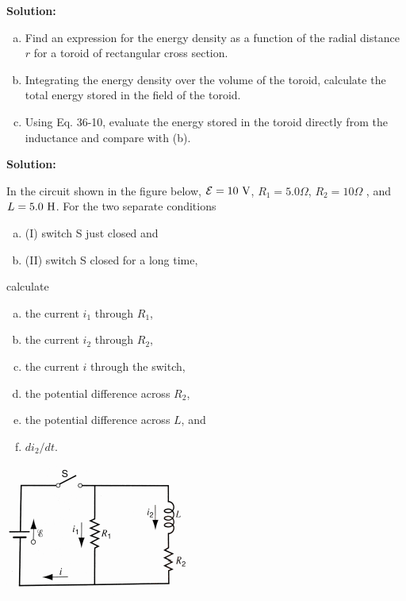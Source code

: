 \documentclass[11pt]{article}
\newcommand{\be}{\begin{enumerate}[a) ]}
\newcommand{\ee}{\end{enumerate}}
\begin{document}
\textbf{Solution:}\\

\clearpage

\begin{problem}[(P34.9)]
\be
\item Find an expression for the energy density as a function of the radial distance $r$ for a toroid
of rectangular cross section.
\item Integrating the energy density over the volume of the toroid, calculate the total energy stored
in the field of the toroid.
\item Using Eq. 36-10, evaluate the energy stored in the toroid directly from the inductance and
compare with (b).
\ee
\end{problem}


\textbf{Solution:}\\

\clearpage

\begin{problem}[(E36.21)]
In the circuit shown in the figure below, $\mathcal{E} = 10~\mathrm{V}$, $R_1 = 5.0\Omega$, $R_2 = 10 \Omega$ , and $L = 5.0~\mathrm{H}$. For the two
separate conditions
\be
\item[(I) ] switch S just closed and
\item[(II) ] switch S closed for a long time,
\ee
calculate
\be
\item the current $i_1$ through $R_1$,
\item the current $i_2$ through $R_2$,
\item the current $i$ through the switch,
\item the potential difference across $R_2$,
\item the potential difference across $L$, and
\item $di_2/dt$.
\ee
\begin{center}
\includegraphics[scale=0.6]{prob4.png}
\end{center}
\end{problem}
\end{document}

